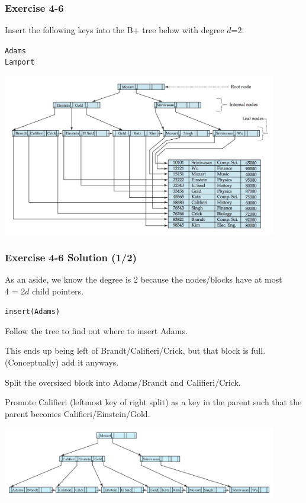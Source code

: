\begin{frame}
\frametitle{Exercise 4-6}

Insert the following keys into the B+ tree below with degree $d$=2:

\texttt{Adams}\\
\texttt{Lamport}

\begin{center}
  \includegraphics[width=0.9\textwidth]{images/b-tree-complete.png}
\end{center}

\end{frame}


\begin{frame}
\frametitle{Exercise 4-6 Solution (1/2)}

As an aside, we know the degree is 2 because the nodes/blocks have at most \\
4 = 2$d$ child pointers.

\texttt{insert(Adams)}

Follow the tree to find out where to insert Adams.

This ends up being left of Brandt/Califieri/Crick, but that block is full. (Conceptually) add it anyways.

Split the oversized block into Adams/Brandt and Califieri/Crick.

Promote Califieri (leftmost key of right split) as a key in the parent such that the parent becomes Califieri/Einstein/Gold.

\begin{center}
  \includegraphics[width=0.9\textwidth]{images/b-tree-insert_adams.png}
\end{center}

\end{frame}


